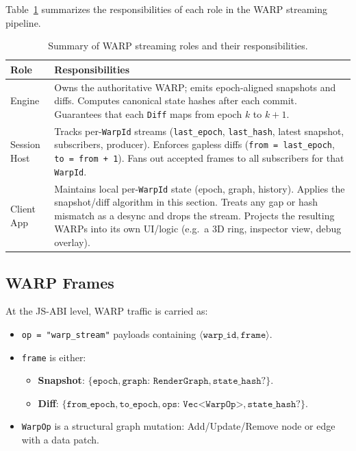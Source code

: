 Table~\ref{tab:warp-role-summary} summarizes the responsibilities of each role
in the WARP streaming pipeline.

\begin{table}[h]
  \centering
  \begin{tabular}{@{}p{}p{}@{}}
    \toprule
    \textbf{Role} & \textbf{Responsibilities} \\
    \midrule
    Engine
      & Owns the authoritative WARP; emits epoch-aligned snapshots and diffs.
        Computes canonical state hashes after each commit.
        Guarantees that each \texttt{Diff} maps from epoch \(k\) to \(k+1\). \\
    Session Host
      & Tracks per-\texttt{WarpId} streams (\texttt{last\_epoch},
        \texttt{last\_hash}, latest snapshot, subscribers, producer).
        Enforces gapless diffs (\texttt{from = last\_epoch},
        \texttt{to = from + 1}). Fans out accepted frames to all
        subscribers for that \texttt{WarpId}. \\
    Client App
      & Maintains local per-\texttt{WarpId} state (epoch, graph, history).
        Applies the snapshot/diff algorithm in this section.
        Treats any gap or hash mismatch as a desync and drops the stream.
        Projects the resulting WARPs into its own UI/logic (e.g.\ a 3D ring,
        inspector view, debug overlay). \\
    \bottomrule
  \end{tabular}
  \caption{Summary of WARP streaming roles and their responsibilities.}
  \label{tab:warp-role-summary}
\end{table}

\subsection{WARP Frames}

At the JS-ABI level, WARP traffic is carried as:

\begin{itemize}
  \item \texttt{op = "warp\_stream"} payloads containing
        \(\langle\texttt{warp\_id}, \texttt{frame}\rangle\).
  \item \texttt{frame} is either:
    \begin{itemize}
      \item \textbf{Snapshot}:
        \(\{\texttt{epoch}, \texttt{graph: RenderGraph}, \texttt{state\_hash?}\}\).
      \item \textbf{Diff}:
        \(\{\texttt{from\_epoch}, \texttt{to\_epoch}, \texttt{ops: Vec<WarpOp>}, \texttt{state\_hash?}\}\).
    \end{itemize}
  \item \texttt{WarpOp} is a structural graph mutation:
    Add/Update/Remove node or edge with a data patch.
\end{itemize}

